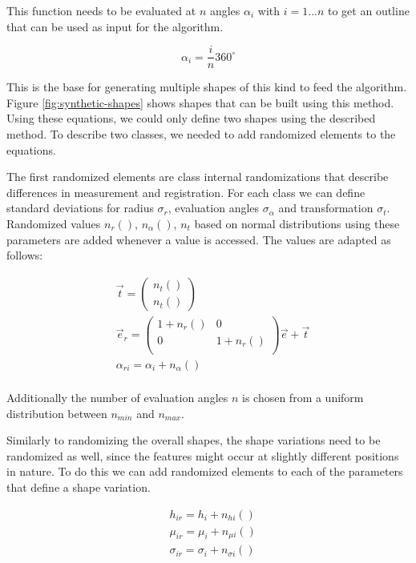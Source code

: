 \documentclass[pdftex,12pt,a4paper]{report}
\begin{document}
This function needs to be evaluated at $n$ angles $\alpha_i$ with $i = 1 ... n$ to get an outline that can be used as input for the algorithm.

\begin{equation}
	\alpha_i = \frac{i}{n} 360^{\circ}
\end{equation}

This is the base for generating multiple shapes of this kind to feed the algorithm. Figure \ref{fig:synthetic-shapes} shows shapes that can be built using this method. Using these equations, we could only define two shapes using the described method. To describe two classes, we needed to add randomized elements to the equations.

The first randomized elements are class internal randomizations that describe differences in measurement and registration. For each class we can define standard deviations for radius $\sigma_r$, evaluation angles $\sigma_\alpha$ and transformation $\sigma_t$. Randomized values $n_r()$, $n_\alpha()$, $n_t$ based on normal distributions using these parameters are added whenever a value is accessed. The values are adapted as follows:

\begin{equation}
	\begin{split}
		& \vec{t} = \left( \begin{array}{c}
			n_t() \\
			n_t()
		\end{array} \right) \\
		& \vec{e}_r = \begin{pmatrix}
			1 + n_r() & 0 \\
			0 & 1 + n_r() \\
		\end{pmatrix} \vec{e}  + \vec{t} \\
		& \alpha_{ri} = \alpha_i + n_\alpha() \\
	\end{split}
\end{equation}

Additionally the number of evaluation angles $n$ is chosen from a uniform distribution between $n_{min}$ and $n_{max}$.

Similarly to randomizing the overall shapes, the shape variations need to be randomized as well, since the features might occur at slightly different positions in nature. To do this we can add randomized elements to each of the parameters that define a shape variation.

\begin{equation}
	\begin{split}
		& h_{ir} = h_i + n_{hi}() \\
		& \mu_{ir} = \mu_i + n_{\mu i}() \\
		& \sigma_{ir} = \sigma_i + n_{\sigma i}() \\
	\end{split}
\end{equation}
\end{document}
